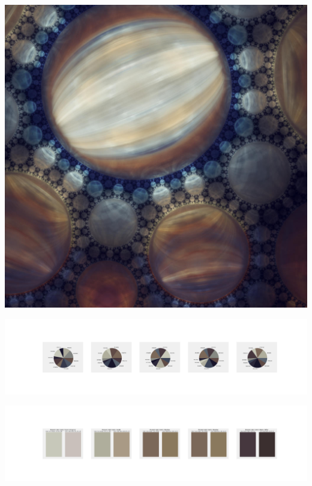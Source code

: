 \documentclass[11pt]{article}
\begin{document}
\begin{landscape}
    \begin{center}
    \includegraphics[width=\textwidth]{./nbimg/file (318).jpg}
    \end{center}

    \begin{center}
    \includegraphics[width=250mm]{./nbimg/pie-243.jpg}
    \end{center}

    \begin{center}
    \includegraphics[width=250mm]{./nbimg/peak-243.jpg}
    \end{center}
    


\end{landscape}
\end{document}
